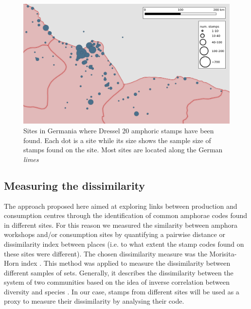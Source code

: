 \documentclass[review]{elsarticle}
\newcommand{\memo}[2]{\textcolor{#1}{#2}}
\newcommand{\xavi}[1]{\memo{magenta}{XRC: #1\\}}
\begin{document}
\begin{figure}[htp]
	\centering
\includegraphics[width=\linewidth]{figs/germania}
\caption{Sites in Germania where Dressel 20 amphoric stamps have been found. Each dot is a site while its size shows the sample size of stamps found on the site. Most sites are located along the German \textit{limes}}
\label{germania}
\end{figure}


\subsection{Measuring the dissimilarity}



The approach proposed here aimed at exploring links between production and consumption centres through the identification of common amphorae codes found in different sites. For this reason we measured the similarity between amphora workshops and/or consumption sites by quantifying a pairwise distance or dissimilarity index between places (i.e. to what extent the stamp codes found on these sites were different). The chosen dissimilarity measure was the Morisita-Horn index \citep{morisita_measuring_1959, horn_measurement_1966}. This method was applied to measure the dissimilarity between different samples of sets. Generally, it describes the dissimilarity between the system of two communities based on the idea of inverse correlation between diversity and species \citep{magurran_why_1988}. In our case, stamps from different sites will be used as a proxy to measure their dissimilarity by analysing their code. 
\end{document}
